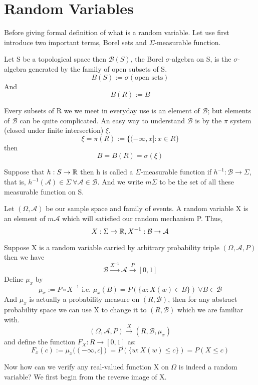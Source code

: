 \documentclass[Probability_Theory.tex]{subfiles}
\begin{document}
\section{Random Variables}
Before giving formal definition of what is a random variable. Let use first introduce two important terms, Borel sets and $\Sigma$-measurable function.
\begin{definition}
Let S be a topological space then $\mathcal{B}(S)$, the Borel $\sigma$-algebra on S, is the $\sigma$-algebra generated by the family of open subsets of S. $$B(S):=\sigma(\text{open sets})$$
And $$B(R):=B$$
\end{definition}
Every subsets of R we we meet in everyday use is an element of $\mathcal{B}$; but elements of $\mathcal{B}$ can be quite complicated. An easy way to understand $\mathcal{B}$ is by the $\pi$ system (closed under finite intersection) $\xi$, $$\xi=\pi(R):=\{(-\infty,x]:x\in R\}$$ then $$B=B(R)=\sigma(\xi)$$
\begin{definition}
Suppose that $h:S\rightarrow{\mathbb R}$ then h is called a $\Sigma$-measurable function if $h^{-1}:\mathcal{B}\rightarrow\Sigma$, that is, $h^{-1}(\mathcal{A})\in \Sigma\ \forall \mathcal{A}\in\mathcal{B}.$
And we write $m\Sigma$ to be the set of all these measurable function on S.
\end{definition} 
\begin{definition}
Let $(\Omega,\mathcal{A})$ be our sample space and family of events. A random variable X  is an element of $m\mathcal{A}$ which will satisfied our random mechanism P. Thus,
$$X:\Sigma\rightarrow{\mathbb R}, X^{-1}:\mathcal{B}\rightarrow\mathcal{A}$$
\end{definition}
\begin{intuition}
Suppose X is a random variable carried by arbitrary probability triple $(\Omega,\mathcal{A},P)$ then we have $$\mathcal{B}\xrightarrow{X^{-1}} \mathcal{A} \xrightarrow{P} [0,1]$$
Define $\mu_x$ by 
$$\mu_x:=P\circ X^{-1} \text{  i.e.  } \mu_x(B)=P(\{w:X(w)\in B\})\  \forall B\in \mathcal{B}$$
And $\mu_x$ is actually a probability measure on $(R,\mathcal{B})$, then for any abstract probability space we can use X to change it to $(R,\mathcal{B})$ which we are familiar with. 
$$(\Omega,\mathcal{A},P)\xrightarrow{X} (R,\mathcal{B},\mu_x)$$ and define the function $F_X:R\rightarrow [0,1]$ as: 
$$F_x(c):=\mu_x((-\infty,c])=P(\{w:X(w)\leq c\})=P(X\leq c)$$
\end{intuition}
Now how can we verify any real-valued function X on $\Omega$ is indeed a random variable? We first begin from the reverse image of X. 
\end{document}
